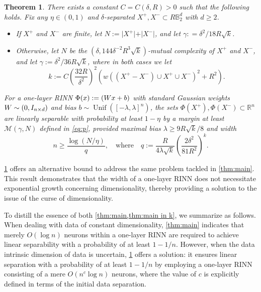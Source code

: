 \documentclass[aoap]{imsart}
\numberwithin{equation}{section}
\newtheorem{theorem}{Theorem}[section]
\theoremstyle{definition}
\theoremstyle{remark}
\newcommand{\N}{\mathbb{N}}
\newcommand{\R}{\mathbb{R}} %
\numberwithin{equation}{section}
\newcommand{\0}{\mathbf{0}}
\newcommand{\1}{\mathbf{1}}
\newcommand{\B}{\mathbb{B}}
\DeclareMathOperator{\Unif}{Unif}
\let \Re \relax
\DeclareMathOperator{\Re}{ReLU}
\let \N \relax
\DeclareMathOperator{\N}{N}
\numberwithin{equation}{section}
\begin{document}
\begin{theorem}\label{thm:main in k}
There exists a constant $C = C(\delta, R)>0$ such that the following holds. Fix any $\eta \in (0, 1)$ and $\delta$-separated $X^{+}, X^{-}\subset R\B_{2}^{d}$ with $d\geq 2$.


\begin{itemize}
	\item If $X^+$ and $X^-$ are finite, let $N:=\vert X^{+}\vert +\vert X^{-}\vert$, and let $\gamma: =\delta^{2}/18R\sqrt{k}$.
	\item Otherwise, let $N$ be the $(\delta, 144\delta^{-2}R^{3}\sqrt{k})$-mutual complexity of $X^+$ and $X^-$, and let $\gamma:= \delta^{2}/36R\sqrt{k}$, where in both cases we let
\begin{equation}\label{eq:k}
 k := C\left(\frac{32R}{\delta^2}\right)^2\left(w\left((X^+-X^-)\cup X^+\cup X^-\right)^2+R^2\right).
\end{equation}
\end{itemize}
For a one-layer RINN $\Phi(x):=\Re(Wx+b)$ with standard Gaussian weights $W\sim \N(0, I_{n\times d})$ and bias $b\sim \Unif\left([-\lambda, \lambda]^n\right)$, the sets $\Phi(X^{+}), \Phi (X^{-})\subset\R^{n}$ are linearly separable with probability at least $1-\eta$ by a margin at least $\mathcal{M}(\gamma,N)$ defined in \eqref{eq:p}, provided maximal bias $\lambda \geq 9R\sqrt{k}/8$ and width \begin{equation}\label{eq:q}
n \geq \frac{\log (N/\eta)}{q}, \quad \text{where}\quad  q :=\frac{R}{4\lambda \sqrt{k}}\left(\frac{2\delta^2}{81R^2}\right)^k.
\end{equation}
\end{theorem}

\cref{thm:main in k} offers an alternative bound to address the same problem tackled in \cref{thm:main}. This result demonstrates that the width of a one-layer RINN does not necessitate exponential growth concerning dimensionality, thereby providing a solution to the issue of the curse of dimensionality.

To distill the essence of both \cref{thm:main,thm:main in k}, we summarize as follows. When dealing with data of constant dimensionality, \cref{thm:main} indicates that merely $O(\log n)$ neurons within a one-layer RINN are required to achieve linear separability with a probability of at least $1-1/n$. However, when the data intrinsic dimension of data is uncertain, \cref{thm:main in k} offers a solution: it ensures linear separation with a probability of at least $1-1/n$ by employing a one-layer RINN consisting of a mere $O(n^c\log n)$ neurons, where the value of $c$ is explicitly defined in terms of the initial data separation.
\end{document}
